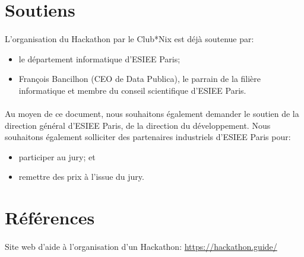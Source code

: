 \documentclass{article}
\begin{document}
\section{Soutiens}

\paragraph{}
L'organisation du Hackathon par le Club*Nix est déjà soutenue par:

\begin{itemize}
	\item le département informatique d'ESIEE Paris;
	\item François Bancilhon (CEO de Data Publica), le parrain de la filière
		informatique et membre du conseil scientifique d'ESIEE Paris.
\end{itemize}

\paragraph{}
Au moyen de ce document, nous souhaitons également demander le soutien de la
direction général d'ESIEE Paris, de la direction du développement. Nous
souhaitons également solliciter des partenaires industriels d'ESIEE Paris pour:

\begin{itemize}
	\item participer au jury; et
	\item remettre des prix à l'issue du jury.
\end{itemize}

\section{Références}

\paragraph{}
Site web d'aide à l'organisation d'un Hackathon: \url{https://hackathon.guide/}
\end{document}
